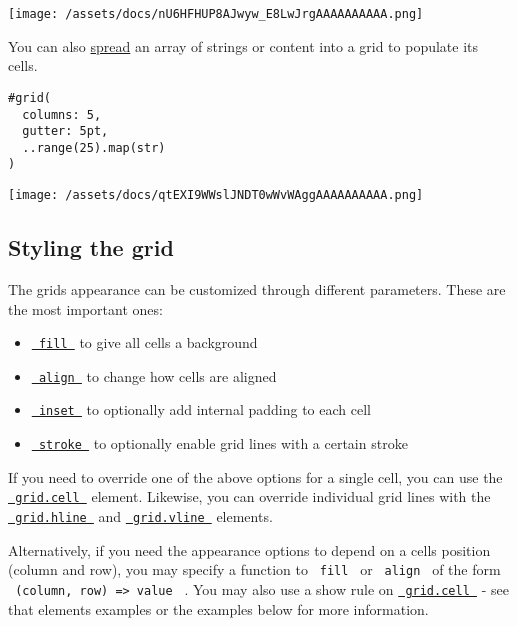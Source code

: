 \texttt{[image: /assets/docs/nU6HFHUP8AJwyw\_E8LwJrgAAAAAAAAAA.png]}

You can also
\href{/docs/reference/foundations/arguments/\#spreading}{spread} an
array of strings or content into a grid to populate its cells.

\begin{verbatim}
#grid(
  columns: 5,
  gutter: 5pt,
  ..range(25).map(str)
)
\end{verbatim}

\texttt{[image: /assets/docs/qtEXI9WWslJNDT0wWvWAggAAAAAAAAAA.png]}

\subsection{Styling the grid}\label{styling-the-grid}

The grid\textquotesingle s appearance can be customized through
different parameters. These are the most important ones:

\begin{itemize}
\tightlist
\item
  \href{/docs/reference/layout/grid/\#parameters-fill}{\texttt{\ fill\ }}
  to give all cells a background
\item
  \href{/docs/reference/layout/grid/\#parameters-align}{\texttt{\ align\ }}
  to change how cells are aligned
\item
  \href{/docs/reference/layout/grid/\#parameters-inset}{\texttt{\ inset\ }}
  to optionally add internal padding to each cell
\item
  \href{/docs/reference/layout/grid/\#parameters-stroke}{\texttt{\ stroke\ }}
  to optionally enable grid lines with a certain stroke
\end{itemize}

If you need to override one of the above options for a single cell, you
can use the
\href{/docs/reference/layout/grid/\#definitions-cell}{\texttt{\ grid.cell\ }}
element. Likewise, you can override individual grid lines with the
\href{/docs/reference/layout/grid/\#definitions-hline}{\texttt{\ grid.hline\ }}
and
\href{/docs/reference/layout/grid/\#definitions-vline}{\texttt{\ grid.vline\ }}
elements.

Alternatively, if you need the appearance options to depend on a
cell\textquotesingle s position (column and row), you may specify a
function to \texttt{\ fill\ } or \texttt{\ align\ } of the form
\texttt{\ (column,\ row)\ =\textgreater{}\ value\ } . You may also use a
show rule on
\href{/docs/reference/layout/grid/\#definitions-cell}{\texttt{\ grid.cell\ }}
- see that element\textquotesingle s examples or the examples below for
more information.

